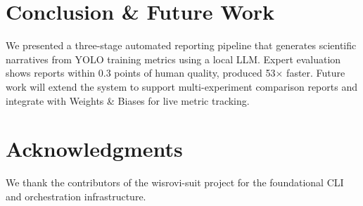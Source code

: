 \documentclass[10pt,twocolumn,letterpaper]{article}
\begin{document}
\section{Conclusion \& Future Work}
We presented a three-stage automated reporting pipeline that generates scientific narratives from YOLO training metrics using a local LLM. Expert evaluation shows reports within 0.3 points of human quality, produced 53$\times$ faster. Future work will extend the system to support multi-experiment comparison reports and integrate with Weights \& Biases for live metric tracking.

\section{Acknowledgments}
We thank the contributors of the wisrovi-suit project for the foundational CLI and orchestration infrastructure.



\end{document}
